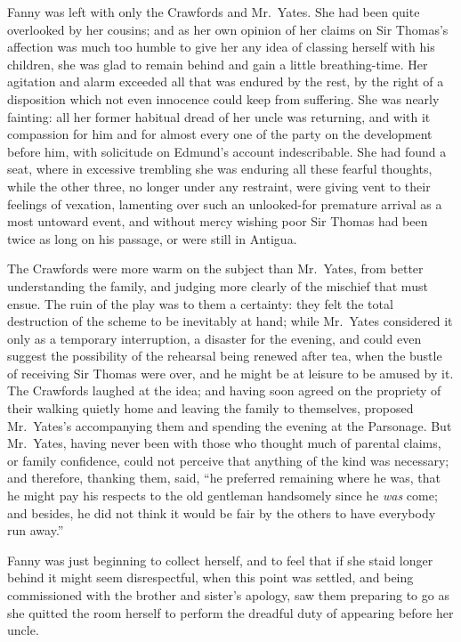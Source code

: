 Fanny was left with only the Crawfords and Mr.\ Yates.
She had been quite overlooked by her cousins; and as her
own opinion of her claims on Sir Thomas's affection
was much too humble to give her any idea of classing
herself with his children, she was glad to remain
behind and gain a little breathing-time. Her agitation
and alarm exceeded all that was endured by the rest,
by the right of a disposition which not even innocence
could keep from suffering.  She was nearly fainting:
all her former habitual dread of her uncle was returning,
and with it compassion for him and for almost every one
of the party on the development before him, with solicitude
on Edmund's account indescribable.  She had found a seat,
where in excessive trembling she was enduring all these
fearful thoughts, while the other three, no longer under
any restraint, were giving vent to their feelings of vexation,
lamenting over such an unlooked-for premature arrival
as a most untoward event, and without mercy wishing
poor Sir Thomas had been twice as long on his passage,
or were still in Antigua.

The Crawfords were more warm on the subject than Mr.\ Yates,
from better understanding the family, and judging more
clearly of the mischief that must ensue.  The ruin of
the play was to them a certainty:  they felt the total
destruction of the scheme to be inevitably at hand;
while Mr.\ Yates considered it only as a temporary interruption,
a disaster for the evening, and could even suggest the
possibility of the rehearsal being renewed after tea,
when the bustle of receiving Sir Thomas were over,
and he might be at leisure to be amused by it.
The Crawfords laughed at the idea; and having soon
agreed on the propriety of their walking quietly home
and leaving the family to themselves, proposed Mr.\ Yates's
accompanying them and spending the evening at the Parsonage.
But Mr.\ Yates, having never been with those who thought much
of parental claims, or family confidence, could not perceive
that anything of the kind was necessary; and therefore,
thanking them, said, ``he preferred remaining where he was,
that he might pay his respects to the old gentleman
handsomely since he \emph{was} come; and besides, he did not
think it would be fair by the others to have everybody run away.''

Fanny was just beginning to collect herself,
and to feel that if she staid longer behind it might
seem disrespectful, when this point was settled, and being
commissioned with the brother and sister's apology,
saw them preparing to go as she quitted the room herself
to perform the dreadful duty of appearing before her uncle.

